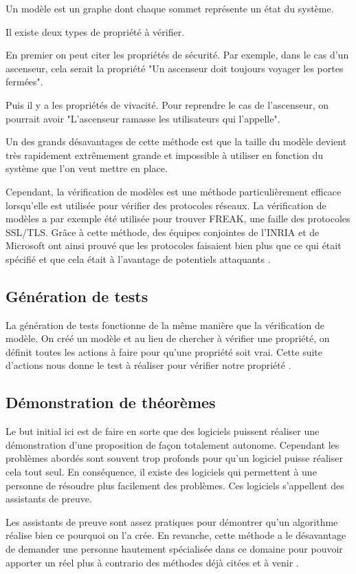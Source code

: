 \documentclass[12pt]{report}
\begin{document}
Un modèle est un graphe dont chaque sommet représente un état du système.

Il existe deux types de propriété à vérifier.

En premier on peut citer les propriétés de sécurité. Par exemple, dans le cas d'un ascenseur, cela serait la propriété "Un ascenseur doit toujours voyager les portes fermées".

Puis il y a les propriétés de vivacité. Pour reprendre le cas de l'ascenseur, on pourrait avoir "L'ascenseur ramasse les utilisateurs qui l'appelle".   

Un des grands désavantages de cette méthode est que la taille du modèle devient très rapidement extrêmement grande et impossible à utiliser en fonction du système que l'on veut mettre en place.
   
Cependant, la vérification de modèles est une méthode particulièrement efficace lorsqu'elle est utilisée pour vérifier des protocoles réseaux. La vérification de modèles a par exemple été utilisée pour trouver FREAK, une faille des protocoles SSL/TLS. Grâce à cette méthode, des équipes conjointes de l'INRIA et de Microsoft ont ainsi prouvé que les protocoles faisaient bien plus que ce qui était spécifié et que cela était à l'avantage de potentiels attaquants \cite{goubault}.    

\subsection{Génération de tests}
La génération de tests fonctionne de la même manière que la vérification de modèle. On créé un modèle et au lieu de chercher à vérifier une propriété, on définit toutes les actions à faire pour qu'une propriété soit vrai. Cette suite d'actions nous donne le test à réaliser pour vérifier notre propriété \cite{griffault}.

\subsection{Démonstration de théorèmes}
Le but initial ici est de faire en sorte que des logiciels puissent réaliser une démonstration d'une proposition de façon totalement autonome. Cependant les problèmes abordés sont souvent trop profonds pour qu'un logiciel puisse réaliser cela tout seul. En conséquence, il existe des logiciels qui permettent à une personne de résoudre plus facilement des problèmes. Ces logiciels s'appellent des assistants de preuve. 

Les assistants de preuve sont assez pratiques pour démontrer qu'un algorithme réalise bien ce pourquoi on l'a crée. En revanche, cette méthode a le désavantage de demander une personne hautement spécialisée dans ce domaine pour pouvoir apporter un réel plus à contrario des méthodes déjà citées et à venir \cite{griffault}.
\end{document}
